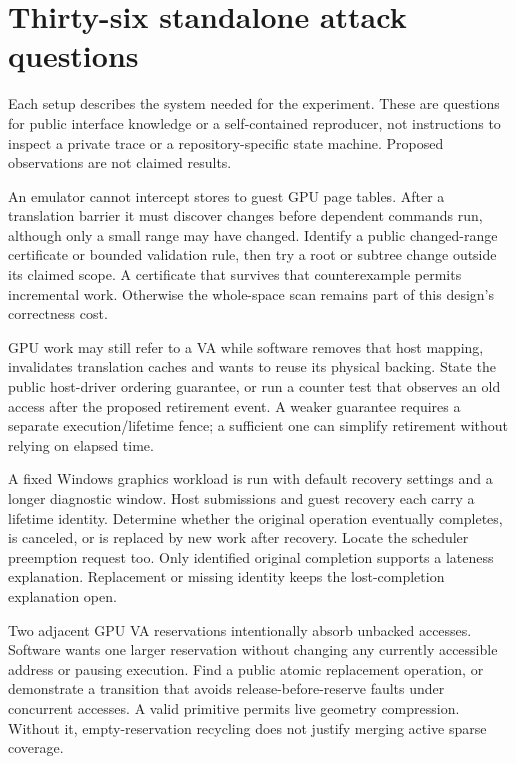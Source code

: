 \clearpage
\section{Thirty-six standalone attack questions}
\label{sec:questions}

Each setup describes the system needed for the experiment. These are questions for public
interface knowledge or a self-contained reproducer, not instructions to inspect a private
trace or a repository-specific state machine. Proposed observations are not claimed results.

{An emulator cannot intercept stores to guest GPU page tables. After a translation barrier it must
discover changes before dependent commands run, although only a small range may have changed.}
{Identify a public changed-range certificate or bounded validation rule, then try a root or
subtree change outside its claimed scope.}
{A certificate that survives that counterexample permits incremental work. Otherwise the
whole-space scan remains part of this design's correctness cost.}
\label{q:whole}

{GPU work may still refer to a VA while software removes that host mapping, invalidates
translation caches and wants to reuse its physical backing.}
{State the public host-driver ordering guarantee, or run a counter test that observes an old
access after the proposed retirement event.}
{A weaker guarantee requires a separate execution/lifetime fence; a sufficient one can simplify
retirement without relying on elapsed time.}
\label{q:retirement}

{A fixed Windows graphics workload is run with default recovery settings and a longer diagnostic
window. Host submissions and guest recovery each carry a lifetime identity.}
{Determine whether the original operation eventually completes, is canceled, or is replaced by new
work after recovery. Locate the scheduler preemption request too.}
{Only identified original completion supports a lateness explanation. Replacement or missing
identity keeps the lost-completion explanation open.}
\label{q:watchdog}

{Two adjacent GPU VA reservations intentionally absorb unbacked accesses. Software wants one
larger reservation without changing any currently accessible address or pausing execution.}
{Find a public atomic replacement operation, or demonstrate a transition that avoids
release-before-reserve faults under concurrent accesses.}
{A valid primitive permits live geometry compression. Without it, empty-reservation recycling does
not justify merging active sparse coverage.}
\label{q:coalesce}

